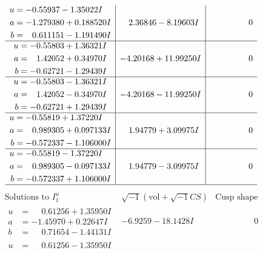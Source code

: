 \documentclass[1p]{elsarticle_modified}
\theoremstyle{definition}
\newcommand{\I}{\sqrt{-1}}
\begin{document}
$$\begin{array}{c|c|c}
\begin{aligned}
u &= -0.55937 - 1.35022 I \\
a &= -1.279380 + 0.188520 I \\
b &= \phantom{-}0.611151 - 1.191490 I\end{aligned}
 & \phantom{-}2.36846 - 8.19603 I & \phantom{-0.000000 } 0 \\ \hline\begin{aligned}
u &= -0.55803 + 1.36321 I \\
a &= \phantom{-}1.42052 + 0.34970 I \\
b &= -0.62721 - 1.29439 I\end{aligned}
 & -4.20168 + 11.99250 I & \phantom{-0.000000 } 0 \\ \hline\begin{aligned}
u &= -0.55803 - 1.36321 I \\
a &= \phantom{-}1.42052 - 0.34970 I \\
b &= -0.62721 + 1.29439 I\end{aligned}
 & -4.20168 - 11.99250 I & \phantom{-0.000000 } 0 \\ \hline\begin{aligned}
u &= -0.55819 + 1.37220 I \\
a &= \phantom{-}0.989305 + 0.097133 I \\
b &= -0.572337 - 1.106000 I\end{aligned}
 & \phantom{-}1.94779 + 3.09975 I & \phantom{-0.000000 } 0 \\ \hline\begin{aligned}
u &= -0.55819 - 1.37220 I \\
a &= \phantom{-}0.989305 - 0.097133 I \\
b &= -0.572337 + 1.106000 I\end{aligned}
 & \phantom{-}1.94779 - 3.09975 I & \phantom{-0.000000 } 0\\
 \hline 
 \end{array}$$\newpage$$\begin{array}{c|c|c}  
\text{Solutions to }I^u_{1}& \I (\text{vol} + \sqrt{-1}CS) & \text{Cusp shape}\\
 \hline 
\begin{aligned}
u &= \phantom{-}0.61256 + 1.35950 I \\
a &= -1.45970 + 0.22647 I \\
b &= \phantom{-}0.71654 - 1.44131 I\end{aligned}
 & -6.9259 - 18.1428 I & \phantom{-0.000000 } 0 \\ \hline\begin{aligned}
u &= \phantom{-}0.61256 - 1.35950 I \\

\end{aligned}
\end{array}$$
\end{document}
